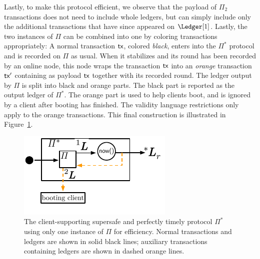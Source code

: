 Lastly, to make this protocol efficient, we observe that the payload of
$\Pi_2$ transactions does not need to include whole ledgers, but can simply
include only the additional transactions that have since appeared on $\Ledger[1]$.
Lastly, the two instances of $\Pi$ can be combined into one by coloring
transactions appropriately: A normal transaction $\textsf{tx}$, colored \emph{black}, enters into the
$\Pi^*$ protocol and is recorded on $\Pi$ as usual. When it stabilizes and its round
has been recorded by an online node, this node wraps the transaction $\textsf{tx}$ into an
\emph{orange} transaction $\textsf{tx}'$ containing as payload $\textsf{tx}$ together with its recorded
round. The ledger output by $\Pi$ is split into black and orange parts. The black part
is reported as the output ledger of $\Pi^*$. The orange part is used to help clients boot,
and is ignored by a client after booting has finished. The validity language restrictions
only apply to the orange transactions. This final construction is illustrated in
Figure~\ref{fig:client-support-feedback}.

\begin{figure}
  \centering
  \includegraphics[width=0.55\columnwidth,keepaspectratio]{figures/perfectly-timely-clients-feedback.pdf}
  \caption{The client-supporting supersafe and perfectly timely protocol $\Pi^*$
           using only one instance of $\Pi$ for efficiency.
           Normal transactions and ledgers are shown in solid black lines;
           auxiliary transactions containing ledgers are shown in dashed
           orange lines.}
 \label{fig:client-support-feedback}
\end{figure}

